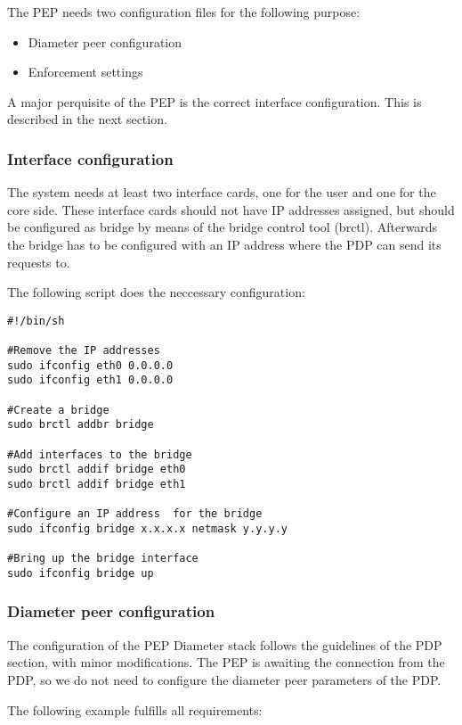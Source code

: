 The PEP needs two configuration files for the following purpose:
\begin{itemize}
	\item Diameter peer configuration
	\item Enforcement settings
\end{itemize}
A major perquisite of the PEP is the correct interface configuration.
This is described in the next section.

\subsubsection{Interface configuration}
The system needs at least two interface cards, one for the user and one for the core side. 
These interface cards should not have IP addresses assigned, but should be configured as bridge by means of the bridge control tool (brctl). Afterwards the bridge has to be configured with an IP address where the PDP can send its requests to.

The following script does the neccessary configuration:

\begin{lstlisting}[caption=Example of a PEP Enforcement Setting, label={lst:PEPBridgeConf}]
#!/bin/sh

#Remove the IP addresses
sudo ifconfig eth0 0.0.0.0
sudo ifconfig eth1 0.0.0.0

#Create a bridge
sudo brctl addbr bridge

#Add interfaces to the bridge
sudo brctl addif bridge eth0
sudo brctl addif bridge eth1
 
#Configure an IP address  for the bridge
sudo ifconfig bridge x.x.x.x netmask y.y.y.y

#Bring up the bridge interface
sudo ifconfig bridge up
\end{lstlisting}


\subsubsection{Diameter peer configuration}
The configuration of the PEP Diameter stack follows the guidelines of the PDP section, with minor modifications. The PEP is awaiting the connection from the PDP, so we do not need to configure the diameter peer parameters of the PDP.

The following example fulfills all requirements:

